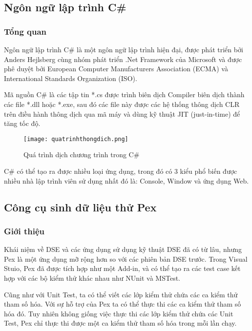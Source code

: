 \subsection*{Ngôn ngữ lập trình C\# }
\subsubsection*{Tổng quan}
Ngôn ngữ lập trình C\# là một ngôn ngữ lập trình hiện đại, được phát triển bởi Anders Hejlsberg cùng nhóm phát triển .Net Framework của Microsoft và được phê duyệt bởi European Computer Manufacturers Association (ECMA) và International Standards Organization (ISO).

Mã nguồn C\# là các tập tin *.cs được trình biên dịch Compiler biên dịch thành các file *.dll hoặc *.exe, sau đó các file này được các hệ thống thông dịch CLR trên điều hành thông dịch qua mã máy và dùng kỹ thuật JIT (just-in-time) để tăng tốc độ.

\begin{center}
	\begin{figure}[h]
		\begin{center}
			\texttt{[image: quatrinhthongdich.png]}
		\end{center}
		\caption{Quá trình dịch chương trình trong C\#}
		
	\end{figure}
\end{center}

C\# có thể tạo ra được nhiều loại ứng dụng, trong đó có 3 kiểu phổ biến được nhiều nhà lập trình viên sử dụng nhất đó là: Console, Window và ứng dụng Web. 

\subsection{Công cụ sinh dữ liệu thử Pex}
\subsubsection*{Giới thiệu}
Khái niệm về DSE và các ứng dụng sử dụng kỹ thuật DSE đã có từ lâu, nhưng Pex là một ứng dụng mỡ rộng hơn so với các phiên bản DSE trước. Trong Visual Stuio, Pex đã được tích hợp như một Add-in, và có thể tạo ra các test case kết hợp với các bộ kiểm thử khác nhau như NUnit và MSTest. 

Cũng như với Unit Test, ta có thể viết các lớp kiểm thử chứa các ca kiểm thử tham số hóa. Với sự hỗ trợ của Pex ta có thể thực thi các ca kiểm thử tham số hóa đó. Tuy nhiên không giống việc thực thi các lớp kiểm thử chứa các Unit Test, Pex chỉ thực thi được một ca kiểm thử tham số hóa trong mỗi lần chạy.

